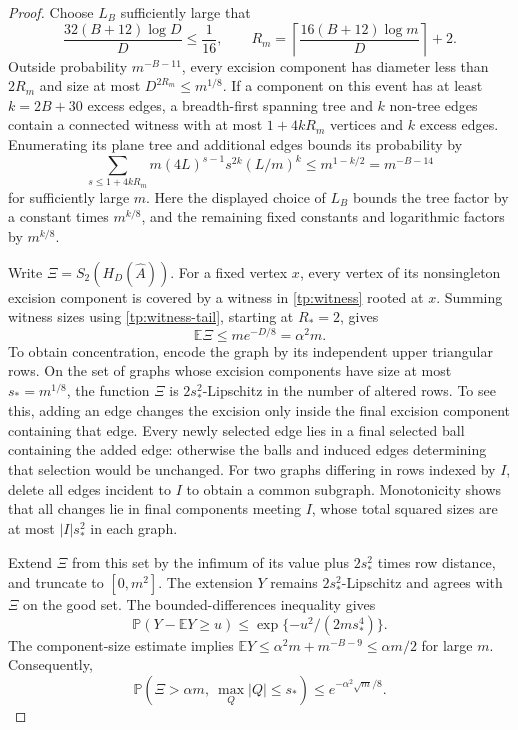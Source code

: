\documentclass[11pt]{article}
\def\P{\mathbb{P}}
\def\E{\mathbb{E}}
\numberwithin{equation}{section}
\begin{document}
\begin{proof}
Choose $L_B$ sufficiently large that
\[
 \frac{32(B+12)\log D}{D}\le\frac1{16},
 \qquad R_m=\left\lceil\frac{16(B+12)\log m}{D}\right\rceil+2.
\]
Outside probability $m^{-B-11}$, every excision component has diameter less than $2R_m$ and size at most $D^{2R_m}\le m^{1/8}$. If a component on this event has at least $k=2B+30$ excess edges, a breadth-first spanning tree and $k$ non-tree edges contain a connected witness with at most $1+4kR_m$ vertices and $k$ excess edges. Enumerating its plane tree and additional edges bounds its probability by
\[
 \sum_{s\le1+4kR_m}m(4L)^{s-1}s^{2k}(L/m)^k
 \le m^{1-k/2}=m^{-B-14}
\]
for sufficiently large $m$. Here the displayed choice of $L_B$ bounds the tree factor by a constant times $m^{k/8}$, and the remaining fixed constants and logarithmic factors by $m^{k/8}$.

Write $\Xi=S_2(H_D(\widehat A))$. For a fixed vertex $x$, every vertex of its nonsingleton excision component is covered by a witness in \eqref{tp:witness} rooted at $x$. Summing witness sizes using \eqref{tp:witness-tail}, starting at $R_*=2$, gives
\[
 \E\Xi\le me^{-D/8}=\alpha^2m.
\]
To obtain concentration, encode the graph by its independent upper triangular rows. On the set of graphs whose excision components have size at most $s_*=m^{1/8}$, the function $\Xi$ is $2s_*^2$-Lipschitz in the number of altered rows. To see this, adding an edge changes the excision only inside the final excision component containing that edge. Every newly selected edge lies in a final selected ball containing the added edge: otherwise the balls and induced edges determining that selection would be unchanged. For two graphs differing in rows indexed by $I$, delete all edges incident to $I$ to obtain a common subgraph. Monotonicity shows that all changes lie in final components meeting $I$, whose total squared sizes are at most $|I|s_*^2$ in each graph.

Extend $\Xi$ from this set by the infimum of its value plus $2s_*^2$ times row distance, and truncate to $[0,m^2]$. The extension $Y$ remains $2s_*^2$-Lipschitz and agrees with $\Xi$ on the good set. The bounded-differences inequality \cite[Theorem~6.2]{BLM13} gives
\[
 \P(Y-\E Y\ge u)\le\exp\{-u^2/(2ms_*^4)\}.
\]
The component-size estimate implies $\E Y\le\alpha^2m+m^{-B-9}\le\alpha m/2$ for large $m$. Consequently,
\[
 \P(\Xi>\alpha m,\ \max_Q|Q|\le s_*)
 \le e^{-\alpha^2\sqrt m/8}.
\]


\end{proof}
\end{document}
